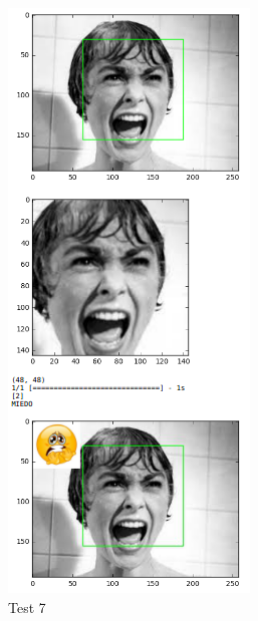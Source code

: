 \begin{frame}

\begin{figure}[!htbp]

\begin{multicols}{2}
   
\includegraphics[angle=0,width=64mm]{Imagenes/test7.png}
    \caption{Test 7}
    \label{fig:test7} 
 

\end{multicols}
\end{figure}
\end{frame}
